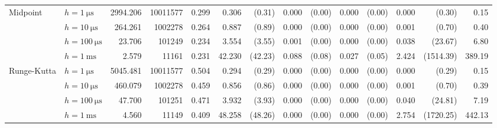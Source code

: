 \begin{sidewaystable}[p]
\begin{tabular}{p{1.5cm} l r r r rr rr rr rr r}
	\multirow{4}{*}{\parbox{1.5cm}{\raggedleft Midpoint}}
		& $h=\SI{1}{\micro\second}$	&   2994.206	& 10011577	&      0.299	&      0.306	& (0.31)	&      0.000	& (0.00)	&      0.000	& (0.00)	&      0.000	& (0.30)	& 0.15\\
		& $h=\SI{10}{\micro\second}$	&    264.261	&  1002278	&      0.264	&      0.887	& (0.89)	&      0.000	& (0.00)	&      0.000	& (0.00)	&      0.001	& (0.70)	& 0.40\\
		& $h=\SI{100}{\micro\second}$	&     23.706	&   101249	&      0.234	&      3.554	& (3.55)	&      0.001	& (0.00)	&      0.000	& (0.00)	&      0.038	& (23.67)	& 6.80\\
		& $h=\SI{1}{\milli\second}$	&      2.579	&    11161	&      0.231	&     42.230	& (42.23)	&      0.088	& (0.08)	&      0.027	& (0.05)	&      2.424	& (1514.39)	& 389.19\\

	\cmidrule(r){1-2}\cmidrule(r){3-5}\cmidrule(r){6-7}\cmidrule(r){8-9}\cmidrule(r){10-11}\cmidrule(r){12-13}\cmidrule(l){14-14}

	\multirow{4}{*}{\parbox{1.5cm}{\raggedleft Runge-Kutta}}
		& $h=\SI{1}{\micro\second}$	&   5045.481	& 10011577	&      0.504	&      0.294	& (0.29)	&      0.000	& (0.00)	&      0.000	& (0.00)	&      0.000	& (0.29)	& 0.15\\
		& $h=\SI{10}{\micro\second}$	&    460.079	&  1002278	&      0.459	&      0.856	& (0.86)	&      0.000	& (0.00)	&      0.000	& (0.00)	&      0.001	& (0.70)	& 0.39\\
		& $h=\SI{100}{\micro\second}$	&     47.700	&   101251	&      0.471	&      3.932	& (3.93)	&      0.000	& (0.00)	&      0.000	& (0.00)	&      0.040	& (24.81)	& 7.19\\
		& $h=\SI{1}{\milli\second}$	&      4.560	&    11149	&      0.409	&     48.258	& (48.26)	&      0.000	& (0.00)	&      0.000	& (0.00)	&      2.754	& (1720.25)	& 442.13\\

	\cmidrule(r){1-2}\cmidrule(r){3-5}\cmidrule(r){6-7}\cmidrule(r){8-9}\cmidrule(r){10-11}\cmidrule(r){12-13}\cmidrule(l){14-14}


\end{tabular}
\end{sidewaystable}
